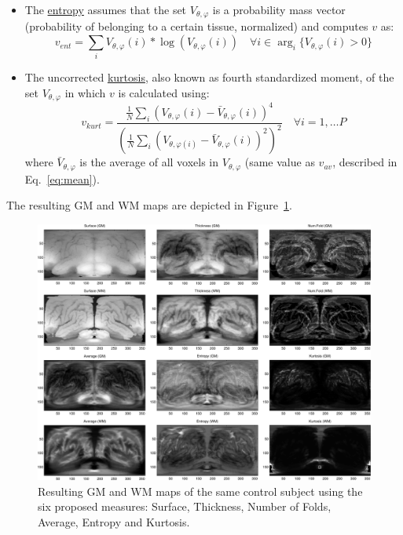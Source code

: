 \begin{itemize}
	\item The \underline{entropy} assumes that the set $V_{\theta,\varphi}$ is a probability mass vector (probability of belonging to a certain tissue, normalized) and computes $v$ as:
	\begin{equation}
	v_{ent}=\sum_i V_{\theta,\varphi}(i)*\log(V_{\theta,\varphi}(i)) \quad \forall i \in \arg_i\lbrace V_{\theta,\varphi}(i)>0\rbrace
	\end{equation}
	
	\item The uncorrected \underline{kurtosis}, also known as fourth standardized moment, of the set $V_{\theta,\varphi}$ in which $v$ is calculated using:
	\begin{equation}
	v_{kurt}= \frac{\frac{1}{N}\sum_i\left(V_{\theta,\varphi}(i)-\bar{V}_{\theta,\varphi}(i)\right)^4}{\left(\frac{1}{N}\sum_i\left(V_{\theta,\varphi(i)}-\bar{V}_{\theta,\varphi}(i)\right)^2\right)^2} \quad \forall i=1,\dots P
	\end{equation}
	where $\bar{V}_{\theta,\varphi}$ is the average of all voxels in $V_{\theta,\varphi}$ (same value as $v_{av}$, described in Eq.~\ref{eq:mean}). 
	
\end{itemize}

The resulting \ac{GM} and \ac{WM} maps are depicted in Figure~\ref{fig:masksGM}. 

\begin{figure}[htp]
	\centering
	\includegraphics[width=1\textwidth]{Graphics/ch6/03-projections}
	
	\caption{Resulting \ac{GM} and \ac{WM} maps of the same control subject using the six proposed measures: Surface, Thickness, Number of Folds, Average, Entropy and Kurtosis.}
	\label{fig:masksGM}
\end{figure}

